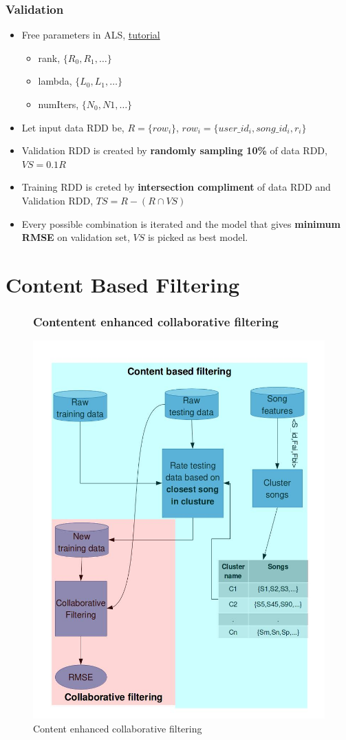 \documentclass[11pt]{beamer}
\begin{document}
\begin{frame}
  \frametitle{Validation}
  \begin{itemize}
    \item Free parameters in ALS, \href{'http://spark.apache.org/docs/latest/mllib-collaborative-filtering.html'}{tutorial}
      \begin{itemize}
        \item rank, $\{R_0,R_1,\dots\}$
        \item lambda, $\{L_0,L_1,\dots\}$
        \item numIters, $\{N_0,N1,\dots\}$
      \end{itemize}
    \item Let input data RDD be, $R = \{row_i\}$, $row_i = \{user\_id_i, song\_id_i, r_i\}$
    \item Validation RDD is created by {\bf randomly sampling 10\%} of data RDD, $VS = 0.1R$
      \item Training RDD is creted by {\bf intersection compliment} of data RDD and Validation RDD,
        $TS = R - (R \cap VS)$
      \item Every possible combination is iterated and the model that gives {\bf minimum RMSE} on
        validation set, $VS$ is picked as best model.
    \end{itemize}
  \end{frame}

  \section{Content Based Filtering}
  \begin{frame}
    \begin{figure}[!h]
      \frametitle{Contentent enhanced collaborative filtering}
      \centering
      \includegraphics[width=0.5\linewidth]{figures/contentBasedBlockDiag.jpg}
      \caption{ Content enhanced collaborative filtering}
    \end{figure}
  \end{frame}
\end{document}
